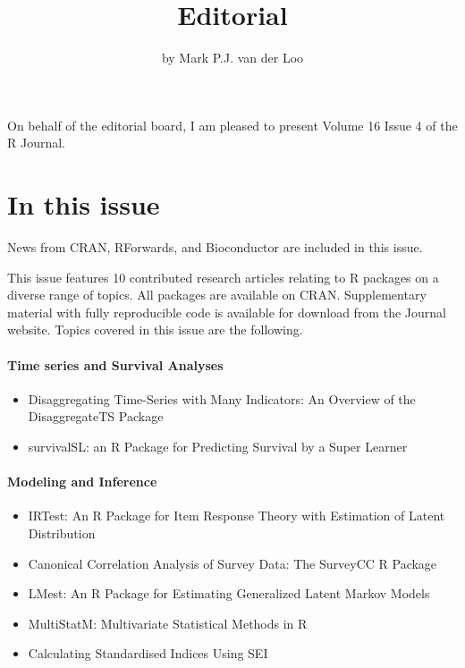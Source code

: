 \title{Editorial}


\author{by Mark P.J. van der Loo}

\maketitle


On behalf of the editorial board, I am pleased to present Volume 16 Issue 4 of
the R Journal.

\hypertarget{in-this-issue}{%
\section*{In this issue}\label{in-this-issue}}

News from CRAN, RForwards, and Bioconductor are included in this issue.

\noindent This issue features 10 contributed research articles relating to R
packages on a diverse range of topics. All packages are available on CRAN.
Supplementary material with fully reproducible code is available for download
from the Journal website. Topics covered in this issue are the following.

\hypertarget{time-series-and-survival-analyses}{%
\paragraph{Time series and Survival Analyses}\label{time-series-and-survival-analyses}}

\begin{itemize}
\tightlist
\item
  Disaggregating Time-Series with Many Indicators: An Overview of the DisaggregateTS Package
\item
  survivalSL: an R Package for Predicting Survival by a Super Learner
\end{itemize}

\hypertarget{modeling-and-inference}{%
\paragraph{Modeling and Inference}\label{modeling-and-inference}}

\begin{itemize}
\tightlist
\item
  IRTest: An R Package for Item Response Theory with Estimation of Latent Distribution
\item
  Canonical Correlation Analysis of Survey Data: The SurveyCC R Package
\item
  LMest: An R Package for Estimating Generalized Latent Markov Models
\item
  MultiStatM: Multivariate Statistical Methods in R
\item
  Calculating Standardised Indices Using SEI
\end{itemize}

